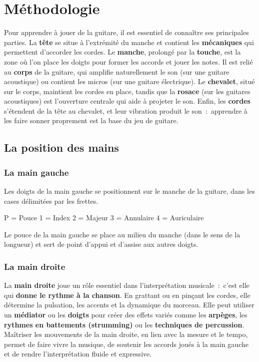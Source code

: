 \section*{Méthodologie}
Pour apprendre à jouer de la guitare, il est essentiel de connaître ses principales parties. La \textbf{tête} se situe à l'extrémité du manche et contient les \textbf{mécaniques} qui permettent d'accorder les cordes. Le \textbf{manche}, prolongé par la \textbf{touche}, est la zone où l'on place les doigts pour former les accords et jouer les notes. Il est relié au \textbf{corps} de la guitare, qui amplifie naturellement le son (sur une guitare acoustique) ou contient les micros (sur une guitare électrique). Le \textbf{chevalet}, situé sur le corps, maintient les cordes en place, tandis que la \textbf{rosace} (sur les guitares acoustiques) est l'ouverture centrale qui aide à projeter le son. Enfin, les \textbf{cordes} s'étendent de la tête au chevalet, et leur vibration produit le son~:~apprendre à les faire sonner proprement est la base du jeu de guitare.
\subsection{La position des mains}
\subsubsection{La main gauche}

Les doigts de la main gauche se positionnent sur le manche de la guitare, dans les cases délimitées par les frettes.

P = Pouce 1 = Index 2 = Majeur 3 = Annulaire 4 = Auriculaire


Le pouce de la main gauche se place au milieu du manche (dans le sens de la longueur) et sert de point d'appui et d'assise aux autres doigts.

\subsubsection{La main droite}

La \textbf{main droite} joue un rôle essentiel dans l'interprétation musicale~:~c'est elle qui \textbf{donne le rythme à la chanson}. En grattant ou en pinçant les cordes, elle détermine la pulsation, les accents et la dynamique du morceau. Elle peut utiliser un \textbf{médiator} ou les \textbf{doigts} pour créer des effets variés comme les \textbf{arpèges}, les \textbf{rythmes en battements (strumming)} ou les \textbf{techniques de percussion}.
Maîtriser les mouvements de la main droite, en lien avec la mesure et le tempo, permet de faire vivre la musique, de soutenir les accords joués à la main gauche et de rendre l'interprétation fluide et expressive.

